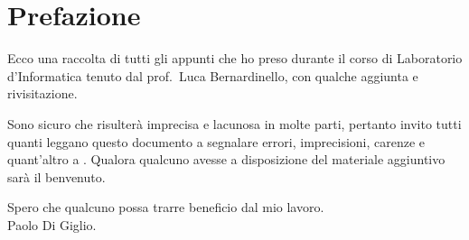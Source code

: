 \chapter*{Prefazione}
{}

Ecco una raccolta di tutti gli appunti che ho preso durante il corso di Laboratorio d'Informatica tenuto dal prof.~Luca Bernardinello, con qualche aggiunta e rivisitazione. 

Sono sicuro che risulterà imprecisa e lacunosa in molte parti, pertanto invito tutti quanti leggano questo documento a segnalare errori, imprecisioni, carenze e quant'altro a . Qualora qualcuno avesse a disposizione del materiale aggiuntivo sarà il benvenuto.

Spero che qualcuno possa trarre beneficio dal mio lavoro.
\\[2ex]
Paolo Di Giglio.